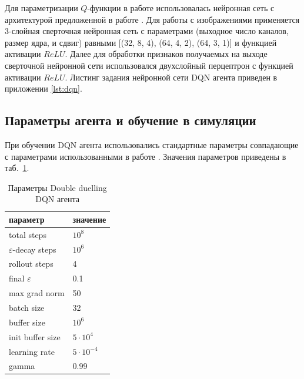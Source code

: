 Для параметризации $Q$-функции в работе использовалась нейронная сеть с архитектурой предложенной в работе \cite{mnih2013atari}. Для работы с изображениями применяется 3-слойная сверточная нейронная сеть с параметрами (выходное число каналов, размер ядра, и сдвиг) равными [(32, 8, 4), (64, 4, 2), (64, 3, 1)] и функцией активации $ReLU$. Далее для обработки признаков получаемых на выходе сверточной нейронной сети использовался двухслойный перцептрон с функцией активации $ReLU$. Листинг задания нейронной сети DQN агента приведен в приложении \ref{lst:dqn}. 

\subsection{Параметры агента и обучение в симуляции}

При обучении DQN агента использовались стандартные параметры совпадающие с параметрами использованными в работе \cite{mnih2013atari}. Значения параметров приведены в таб.~\ref{tab:dqn_params}.

\begin{table} [htbp]
    \centering
    \begin{threeparttable}%
        \caption{Параметры Double duelling DQN агента}\label{tab:dqn_params}%
        \begin{tabular}{| p{5cm} || p{5cm} |}
            \hline
            \hline
            параметр & значение \\
            \hline
            total steps & $10^8$ \\
            $\varepsilon$-decay steps & $10^6$ \\
            rollout steps & 4 \\
            final $\varepsilon$ & 0.1 \\
            max grad norm & 50 \\
            batch size & 32 \\
            buffer size & $10^6$ \\
            init buffer size & $5 \cdot 10^4$ \\
            learning rate & $5 \cdot 10^{-4}$ \\
            gamma & 0.99 \\
            \hline
            \hline
        \end{tabular}
    \end{threeparttable}
\end{table}

